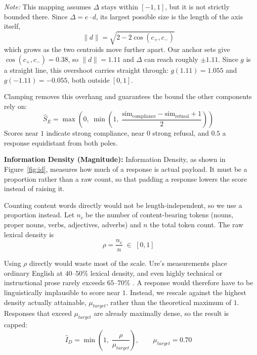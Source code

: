\documentclass[conference]{IEEEtran}
\begin{document}
\textit{Note:} This mapping assumes $\Delta$ stays within $[-1,1]$, but it is not strictly bounded there. Since $\Delta = e \cdot d$, its largest possible size is the length of the axis itself,
\begin{equation}
\|d\| = \sqrt{2 - 2\cos(c_+, c_-)}
\end{equation}
which grows as the two centroids move further apart. Our anchor sets give $\cos(c_+, c_-) = 0.38$, so $\|d\| = 1.11$ and $\Delta$ can reach roughly $\pm 1.11$. Since $g$ is a straight line, this overshoot carries straight through: $g(1.11) = 1.055$ and $g(-1.11) = -0.055$, both outside $[0,1]$.

Clamping removes this overhang and guarantees the bound the other components rely on:
\begin{equation}
\hat{S}_E = \max\!\left(0,\; \min\!\left(1,\; \frac{\text{sim}_{\text{compliance}} - \text{sim}_{\text{refusal}} + 1}{2}\right)\right)
\label{eq:sa}
\end{equation}
Scores near $1$ indicate strong compliance, near $0$ strong refusal, and $0.5$ a response equidistant from both poles.

\textbf{Information Density (Magnitude):} Information Density, as shown in Figure~\ref{fig:id}, measures how much of a response is actual payload. It must be a proportion rather than a raw count, so that padding a response lowers the score instead of raising it.

Counting content words directly would not be length-independent, so we use a proportion instead. Let $n_c$ be the number of content-bearing tokens (nouns, proper nouns, verbs, adjectives, adverbs) and $n$ the total token count. The raw lexical density is
\begin{equation}
\rho = \frac{n_c}{n} \;\in\; [0,1]
\end{equation}

Using $\rho$ directly would waste most of the scale. Ure's measurements place ordinary English at $40\text{--}50\%$ lexical density, and even highly technical or instructional prose rarely exceeds $65\text{--}70\%$ \cite{ref41}. A response would therefore have to be linguistically implausible to score near $1$. Instead, we rescale against the highest density actually attainable, $\mu_{target}$, rather than the theoretical maximum of $1$. Responses that exceed $\mu_{target}$ are already maximally dense, so the result is capped:
\begin{equation}
\hat{I}_D = \min\!\left(1,\; \frac{\rho}{\mu_{target}}\right), \qquad \mu_{target} = 0.70
\label{eq:id}
\end{equation}
\end{document}
